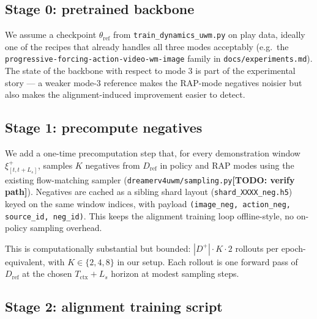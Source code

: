 \documentclass[11pt]{article}
\newcommand{\todo}[1]{\textbf{[TODO: #1]}}
\newcommand{\Dref}{D_{\mathrm{ref}}}
\begin{document}
\subsection{Stage 0: pretrained backbone}
We assume a checkpoint $\theta_{\mathrm{ref}}$ from \texttt{train\_dynamics\_uwm.py} on play data, ideally one of the recipes that already handles all three modes acceptably (e.g.\ the \texttt{progressive-forcing-action-video-wm-image} family in \texttt{docs/experiments.md}). The state of the backbone with respect to mode 3 is part of the experimental story --- a weaker mode-3 reference makes the RAP-mode negatives noisier but also makes the alignment-induced improvement easier to detect.

\subsection{Stage 1: precompute negatives}
\label{sec:impl-neg}
We add a one-time precomputation step that, for every demonstration window $\xi^+_{[t,t+L_s]}$, samples $K$ negatives from $\Dref$ in policy and RAP modes using the existing flow-matching sampler (\texttt{dreamerv4uwm/sampling.py}\todo{verify path}). Negatives are cached as a sibling shard layout (\texttt{shard\_XXXX\_neg.h5}) keyed on the same window indices, with payload \texttt{(image\_neg, action\_neg, source\_id, neg\_id)}. This keeps the alignment training loop offline-style, no on-policy sampling overhead.

This is computationally substantial but bounded: $|D^+|\cdot K\cdot 2$ rollouts per epoch-equivalent, with $K \in \{2, 4, 8\}$ in our setup. Each rollout is one forward pass of $\Dref$ at the chosen $T_{\mathrm{ctx}} + L_s$ horizon at modest sampling steps.

\subsection{Stage 2: alignment training script}
\end{document}
